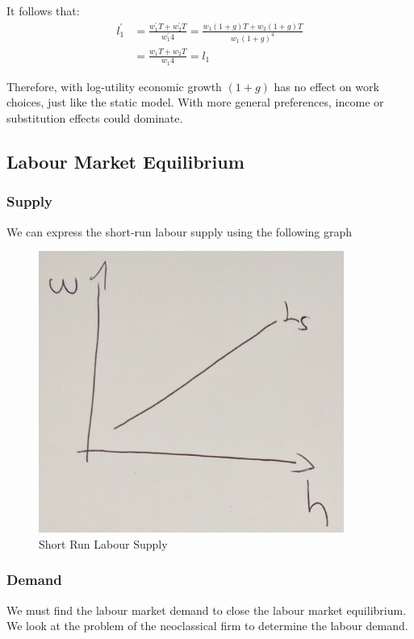 \documentclass[11pt]{article}
\begin{document}
It follows that:
\begin{equation}
\begin{aligned}
l_1^{\prime} & =\frac{w_1^{\prime} T+w_2^{\prime} T}{w_1^{\prime} 4}=\frac{w_1(1+g) T+w_2(1+g) T}{w_1(1+g)^4} \\
& =\frac{w_1 T+w_2 T}{w_1 4}=l_1
\end{aligned}
\end{equation}

Therefore, with log-utility economic growth $(1+g)$ has no effect on work choices, just like the static model. With more general preferences, income or substitution effects could dominate.

\subsection{Labour Market Equilibrium}

\subsubsection{Supply}
We can express the short-run labour supply using the following graph

\begin{figure}[h]
    \centering
    \includegraphics[width=10cm]{photos/short run labour supply.png}
    \caption{Short Run Labour Supply}
    \label{fig:short run labour supply}
\end{figure}

\subsubsection{Demand}
We must find the labour market demand to close the labour market equilibrium. We look at the problem of the neoclassical firm to determine the labour demand.
\end{document}
